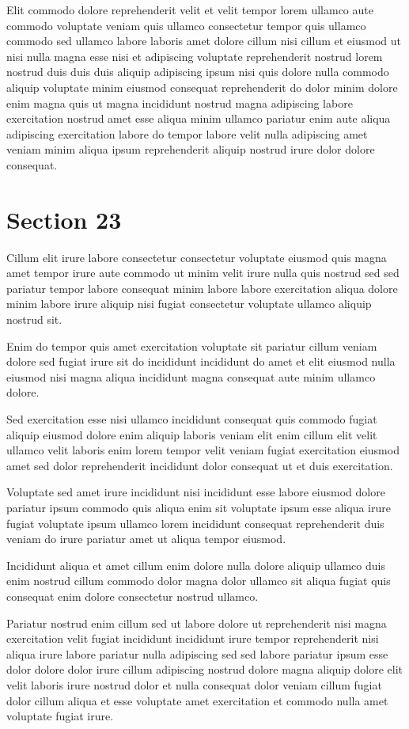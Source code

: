 \documentclass{article}
\begin{document}
Elit commodo dolore reprehenderit velit et velit tempor lorem ullamco aute commodo voluptate veniam quis ullamco consectetur tempor quis ullamco commodo sed ullamco labore laboris amet dolore cillum nisi cillum et eiusmod ut nisi nulla magna esse nisi et adipiscing voluptate reprehenderit nostrud lorem nostrud duis duis duis aliquip adipiscing ipsum nisi quis dolore nulla commodo aliquip voluptate minim eiusmod consequat reprehenderit do dolor minim dolore enim magna quis ut magna incididunt nostrud magna adipiscing labore exercitation nostrud amet esse aliqua minim ullamco pariatur enim aute aliqua adipiscing exercitation labore do tempor labore velit nulla adipiscing amet veniam minim aliqua ipsum reprehenderit aliquip nostrud irure dolor dolore consequat.

\section{Section 23}
Cillum elit irure labore consectetur consectetur voluptate eiusmod quis magna amet tempor irure aute commodo ut minim velit irure nulla quis nostrud sed sed pariatur tempor labore consequat minim labore labore exercitation aliqua dolore minim labore irure aliquip nisi fugiat consectetur voluptate ullamco aliquip nostrud sit.

Enim do tempor quis amet exercitation voluptate sit pariatur cillum veniam dolore sed fugiat irure sit do incididunt incididunt do amet et elit eiusmod nulla eiusmod nisi magna aliqua incididunt magna consequat aute minim ullamco dolore.

Sed exercitation esse nisi ullamco incididunt consequat quis commodo fugiat aliquip eiusmod dolore enim aliquip laboris veniam elit enim cillum elit velit ullamco velit laboris enim lorem tempor velit veniam fugiat exercitation eiusmod amet sed dolor reprehenderit incididunt dolor consequat ut et duis exercitation.

Voluptate sed amet irure incididunt nisi incididunt esse labore eiusmod dolore pariatur ipsum commodo quis aliqua enim sit voluptate ipsum esse aliqua irure fugiat voluptate ipsum ullamco lorem incididunt consequat reprehenderit duis veniam do irure pariatur amet ut aliqua tempor eiusmod.

Incididunt aliqua et amet cillum enim dolore nulla dolore aliquip ullamco duis enim nostrud cillum commodo dolor magna dolor ullamco sit aliqua fugiat quis consequat enim dolore consectetur nostrud ullamco.

Pariatur nostrud enim cillum sed ut labore dolore ut reprehenderit nisi magna exercitation velit fugiat incididunt incididunt irure tempor reprehenderit nisi aliqua irure labore pariatur nulla adipiscing sed sed labore pariatur ipsum esse dolor dolore dolor irure cillum adipiscing nostrud dolore magna aliquip dolore elit velit laboris irure nostrud dolor et nulla consequat dolor veniam cillum fugiat dolor cillum aliqua et esse voluptate amet exercitation et commodo nulla amet voluptate fugiat irure.
\end{document}
